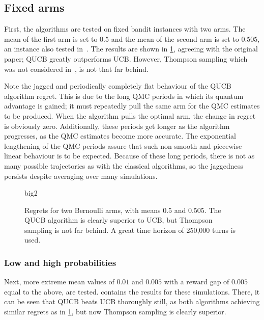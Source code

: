 \subsection{Fixed arms}
\label{sec:sim_fixed_arms}
First, the algorithms are tested on fixed bandit instances with two arms.
The mean of the first arm is set to $0.5$ and the mean of the second arm is set to $0.505$, an instance also tested in~\autocite{wan2022}.
The results are shown in \cref{fig:big2}, agreeing with the original paper; QUCB greatly outperforms UCB.
However, Thompson sampling which was not considered in~\autocite{wan2022}, is not that far behind.

Note the jagged and periodically completely flat behaviour of the QUCB algorithm regret.
This is due to the long QMC periods in which its quantum advantage is gained; it must repeatedly pull the same arm for the QMC estimates to be produced.
When the algorithm pulls the optimal arm, the change in regret is obviously zero.
Additionally, these periods get longer as the algorithm progresses, as the QMC estimates become more accurate.
The exponential lengthening of the QMC periods assure that such non-smooth and piecewise linear behaviour is to be expected.
Because of these long periods, there is not as many possible trajectories as with the classical algorithms, so the jaggedness persists despite averaging over many simulations.

\begin{figure}
    \centering
    \newcommand{\myoptions}{
        width=10cm,
        height=8cm,
        xlabel={Kiloturn},
        ylabel={Regret},
        legend entries={UCB, QUCB, Thompson},
        legend pos=north west,
        legend cell align=left,
        mystyle,
    }
    {big2}
    \caption[
        Regrets for two Bernoulli arms, with means 0.5 and 0.505.
    ]{
        Regrets for two Bernoulli arms, with means 0.5 and 0.505.
        The QUCB algorithm is clearly superior to UCB, but Thompson sampling is not far behind.
        A great time horizon of 250,000 turns is used.
    }
    \label{fig:big2}
\end{figure}

\subsubsection{Low and high probabilities}
Next, more extreme mean values of $0.01$ and $0.005$ with a reward gap of $0.005$ equal to the above, are tested.
 contains the results for these simulations.
There, it can be seen that QUCB beats UCB thoroughly still, as both algorithms achieving similar regrets as in \cref{fig:big2}, but now Thompson sampling is clearly superior.


